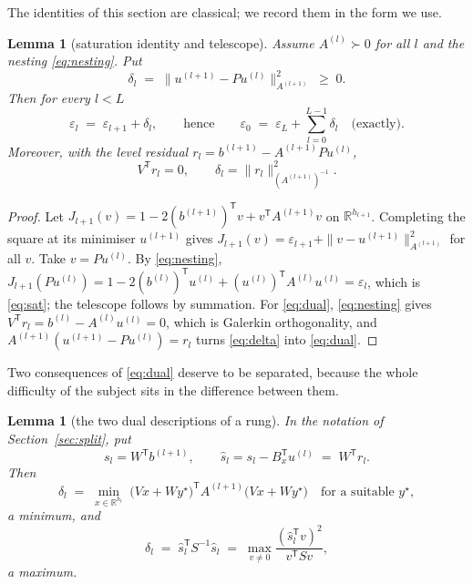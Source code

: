 \documentclass[11pt,a4paper]{article}
\theoremstyle{plain}
\newtheorem{lemma}[theorem]{Lemma}
\theoremstyle{definition}
\newcommand{\R}{\mathbb{R}}
\newcommand{\T}{\mathsf{T}}
\newcommand{\shat}{\widehat{s}}
\newcommand{\PD}{\succ 0}
\begin{document}
The identities of this section are classical; we record them in the form we use.

\begin{lemma}[saturation identity and telescope]
\label{lem:telescope}
Assume $A^{(l)}\PD$ for all $l$ and the nesting \eqref{eq:nesting}. Put
\begin{equation}
\label{eq:delta}
  \delta_{l}\;=\;\bigl\|u^{(l+1)}-Pu^{(l)}\bigr\|_{A^{(l+1)}}^{2}\;\ge\;0 .
\end{equation}
Then for every $l<L$
\begin{equation}
\label{eq:sat}
  \varepsilon_{l}\;=\;\varepsilon_{l+1}+\delta_{l},
  \qquad\text{hence}\qquad
  \varepsilon_{0}\;=\;\varepsilon_{L}+\sum_{l=0}^{L-1}\delta_{l}
  \quad\text{(exactly)} .
\end{equation}
Moreover, with the level residual $r_{l}=b^{(l+1)}-A^{(l+1)}Pu^{(l)}$,
\begin{equation}
\label{eq:dual}
  V^{\T}r_{l}=0,
  \qquad
  \delta_{l}=\bigl\|r_{l}\bigr\|^{2}_{(A^{(l+1)})^{-1}} .
\end{equation}
\end{lemma}

\begin{proof}
Let $J_{l+1}(v)=1-2(b^{(l+1)})^{\T}v+v^{\T}A^{(l+1)}v$ on $\R^{h_{l+1}}$. Completing
the square at its minimiser $u^{(l+1)}$ gives
$J_{l+1}(v)=\varepsilon_{l+1}+\|v-u^{(l+1)}\|^{2}_{A^{(l+1)}}$ for all $v$. Take
$v=Pu^{(l)}$. By \eqref{eq:nesting},
$J_{l+1}(Pu^{(l)})=1-2(b^{(l)})^{\T}u^{(l)}+(u^{(l)})^{\T}A^{(l)}u^{(l)}
=\varepsilon_{l}$, which is \eqref{eq:sat}; the telescope follows by summation. For
\eqref{eq:dual}, \eqref{eq:nesting} gives
$V^{\T}r_{l}=b^{(l)}-A^{(l)}u^{(l)}=0$, which is Galerkin orthogonality, and
$A^{(l+1)}(u^{(l+1)}-Pu^{(l)})=r_{l}$ turns \eqref{eq:delta} into \eqref{eq:dual}.
\end{proof}

Two consequences of \eqref{eq:dual} deserve to be separated, because the whole
difficulty of the subject sits in the difference between them.

\begin{lemma}[the two dual descriptions of a rung]
\label{lem:twoforms}
In the notation of Section~\ref{sec:split}, put
\begin{equation}
\label{eq:shat}
  s_{l}=W^{\T}b^{(l+1)},\qquad
  \shat_{l}=s_{l}-B_{x}^{\T}u^{(l)}\;=\;W^{\T}r_{l} .
\end{equation}
Then
\begin{equation}
\label{eq:primal}
  \delta_{l}
  \;=\;\min_{x\in\R^{h_{l}}}\;
    \bigl(Vx+W y^{\star}\bigr)^{\T}A^{(l+1)}\bigl(Vx+Wy^{\star}\bigr)
  \quad\text{for a suitable }y^{\star},
\end{equation}
a \emph{minimum}, and
\begin{equation}
\label{eq:maximum}
  \delta_{l}
  \;=\;\shat_{l}^{\T}S^{-1}\shat_{l}
  \;=\;\max_{v\neq0}\frac{(\shat_{l}^{\T}v)^{2}}{v^{\T}Sv},
\end{equation}
a \emph{maximum}.
\end{lemma}
\end{document}
